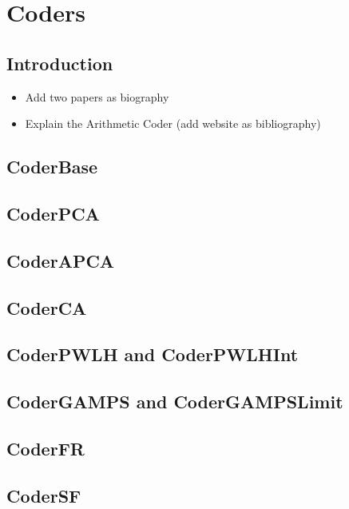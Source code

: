 
\chapter{Coders} %

\label{coders} %


\section{Introduction}
\label{coders:intro}
\begin{itemize}
    \item Add two papers as biography
    \item Explain the Arithmetic Coder (add website as bibliography) 
\end{itemize}

\section{CoderBase}
\label{coders:base}


\section{CoderPCA}
\label{coders:pca}

\section{CoderAPCA}
\label{coders:apca}

\section{CoderCA}
\label{coders:ca}

\section{CoderPWLH and CoderPWLHInt}
\label{coders:pwlh}

\section{CoderGAMPS and CoderGAMPSLimit}
\label{coders:gamps}

\section{CoderFR}
\label{coders:fr}

\section{CoderSF}
\label{coders:sf}
